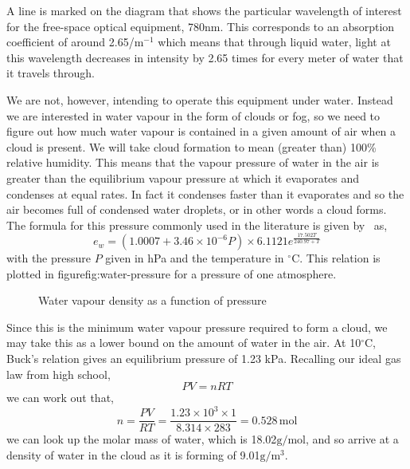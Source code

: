 A line is marked on the diagram that shows the particular wavelength
of interest for the free-space optical equipment, 780nm. This
corresponds to an absorption coefficient of around 2.65/m$^{-1}$ which
means that through liquid water, light at this wavelength decreases in
intensity by 2.65 times for every meter of water that it travels
through.

We are not, however, intending to operate this equipment under
water. Instead we are interested in water vapour in the form of clouds
or fog, so we need to figure out how much water vapour is contained
in a given amount of air when a cloud is present. We will take cloud
formation to mean (greater than) 100\% relative humidity. This means
that the vapour pressure of water in the air is greater than the
equilibrium vapour pressure at which it evaporates and condenses at
equal rates. In fact it condenses faster than it evaporates and so the
air becomes full of condensed water droplets, or in other words a
cloud forms. The formula for this pressure commonly used in the
literature is given by~\cite{buck_new_1981} as,
\begin{equation}
  \label{eq:buck}
  e_w = (1.0007 + 3.46\times 10^{-6}P)\times 6.1121e^{\frac{17.502T}{240.97+T}}
\end{equation}
with the pressure $P$ given in hPa and the temperature in
$^\circ$C. This relation is plotted in figure{fig:water-pressure} for
a pressure of one atmosphere.
\begin{figure}[h]
  \centering
  \caption{Water vapour density as a function of pressure}
  \label{fig:water-pressure}
\end{figure}

Since this is the minimum water vapour pressure required to form a
cloud, we may take this as a lower bound on the amount of water in the
air. At 10$^\circ$C, Buck's relation gives an equilibrium pressure of
1.23 kPa. Recalling our ideal gas law from high school,
\begin{equation}
  \label{eq:ideal-gas}
  PV = nRT
\end{equation}
we can work out that,
\begin{equation*}
  n = \frac{PV}{RT} 
    = \frac{1.23\times 10^3 \times 1}
           {8.314 \times 283}
    = 0.528\, \text{mol}
\end{equation*}
we can look up the molar mass of water, which is
18.02$\text{g}/\text{mol}$, and so arrive at a density of water in the
cloud as it is forming of 9.01$\text{g}/\text{m}^3$.

